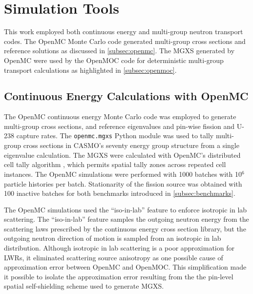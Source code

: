 \section{Simulation Tools}
\label{sec:simulation-tools}

This work employed both continuous energy and multi-group neutron transport codes. The OpenMC Monte Carlo code generated multi-group cross sections and reference solutions as discussed in \autoref{subsec:openmc}. The MGXS generated by OpenMC were used by the OpenMOC code for deterministic multi-group transport calculations as highlighted in \autoref{subsec:openmoc}.


\subsection{Continuous Energy Calculations with OpenMC}
\label{subsec:openmc}

The OpenMC continuous energy Monte Carlo code was employed to generate multi-group cross sections, and reference eigenvalues and pin-wise fission and U-238 capture rates. The \texttt{openmc.mgxs} Python module \citep{boyd2018openmcmgxs} was used to tally multi-group cross sections in CASMO's seventy energy group structure \citep{rhodes2006casmo} from a single eigenvalue calculation. The MGXS were calculated with OpenMC's distributed cell tally algorithm \citep{lax2014distribcell}, which permits spatial tally zones across repeated cell instances. The OpenMC simulations were performed with 1000 batches with 10$^{6}$ particle histories per batch. Stationarity of the fission source was obtained with 100 inactive batches for both benchmarks introduced in \autoref{subsec:benchmarks}.

The OpenMC simulations used the ``iso-in-lab'' feature to enforce isotropic in lab scattering. The ``iso-in-lab'' feature samples the outgoing neutron energy from the scattering laws prescribed by the continuous energy cross section library, but the outgoing neutron direction of motion is sampled from an isotropic in lab distribution. Although isotropic in lab scattering is a poor approximation for LWRs, it eliminated scattering source anisotropy as one possible cause of approximation error between OpenMC and OpenMOC. This simplification made it possible to isolate the approximation error resulting from the the pin-level spatial self-shielding scheme used to generate MGXS.


